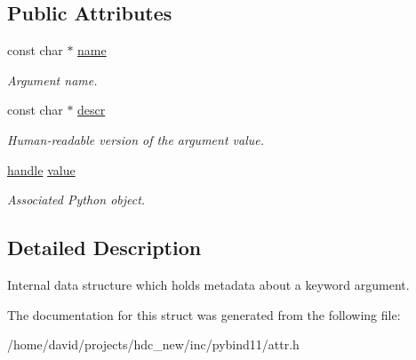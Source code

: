 \subsection*{Public Attributes}
\begin{DoxyCompactItemize}
\item 
const char $\ast$ \hyperlink{structargument__record_ac9bb5bf320b8eb1de1ef5f9dcc808269}{name}\hypertarget{structargument__record_ac9bb5bf320b8eb1de1ef5f9dcc808269}{}\label{structargument__record_ac9bb5bf320b8eb1de1ef5f9dcc808269}

\begin{DoxyCompactList}\small\item\em Argument name. \end{DoxyCompactList}\item 
const char $\ast$ \hyperlink{structargument__record_a5bee7fa9c31dc8e5e1b9406cb483e610}{descr}\hypertarget{structargument__record_a5bee7fa9c31dc8e5e1b9406cb483e610}{}\label{structargument__record_a5bee7fa9c31dc8e5e1b9406cb483e610}

\begin{DoxyCompactList}\small\item\em Human-\/readable version of the argument value. \end{DoxyCompactList}\item 
\hyperlink{classhandle}{handle} \hyperlink{structargument__record_a3d6ba6a0cb59834720cb7d7df5bdb2c2}{value}\hypertarget{structargument__record_a3d6ba6a0cb59834720cb7d7df5bdb2c2}{}\label{structargument__record_a3d6ba6a0cb59834720cb7d7df5bdb2c2}

\begin{DoxyCompactList}\small\item\em Associated Python object. \end{DoxyCompactList}\end{DoxyCompactItemize}


\subsection{Detailed Description}
Internal data structure which holds metadata about a keyword argument. 

The documentation for this struct was generated from the following file\+:\begin{DoxyCompactItemize}
\item 
/home/david/projects/hdc\+\_\+new/inc/pybind11/attr.\+h\end{DoxyCompactItemize}
